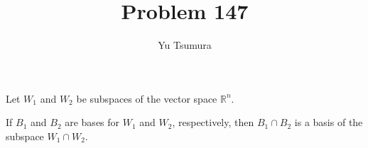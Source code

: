\documentclass{ximera}
\title{Problem 147}
\author{Yu Tsumura}
\begin{document}
\begin{problem}
	 
  Let $W_1$ and $W_2$ be subspaces of the vector space $\mathbb{R}^n$.
  
  If $B_1$ and $B_2$ are bases for $W_1$ and $W_2$, respectively, then
  $B_1\cap B_2$ is a basis of the subspace $W_1\cap W_2$.
  \begin{multipleChoice}
  \end{multipleChoice}
	
\end{problem}
\end{document}
